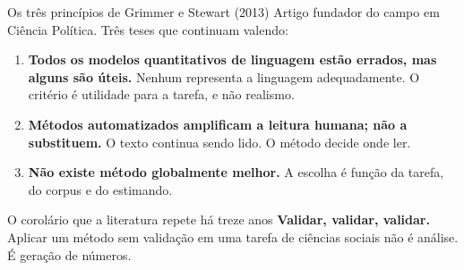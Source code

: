 \documentclass[11pt,aspectratio=169]{beamer}
\begin{document}
\begin{frame}{Os três princípios de Grimmer e Stewart (2013)}
Artigo fundador do campo em Ciência Política. Três teses que continuam valendo:
\vspace{0.25cm}
\begin{enumerate}
  \item \textbf{Todos os modelos quantitativos de linguagem estão errados, mas
        alguns são úteis.} Nenhum representa a linguagem adequadamente. O
        critério é utilidade para a tarefa, e não realismo.
  \pause
  \item \textbf{Métodos automatizados amplificam a leitura humana; não a
        substituem.} O texto continua sendo lido. O método decide onde ler.
  \pause
  \item \textbf{Não existe método globalmente melhor.} A escolha é função da
        tarefa, do corpus e do estimando.
\end{enumerate}
\pause
\vspace{0.25cm}
\begin{alertblock}{O corolário que a literatura repete há treze anos}
\textbf{Validar, validar, validar.} Aplicar um método sem validação em uma
tarefa de ciências sociais não é análise. É geração de números.
\end{alertblock}
\end{frame}
\end{document}
